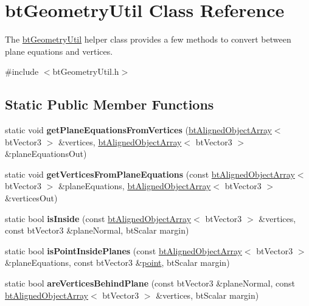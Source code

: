 \hypertarget{classbt_geometry_util}{\section{bt\+Geometry\+Util Class Reference}
\label{classbt_geometry_util}
}


The \hyperlink{classbt_geometry_util}{bt\+Geometry\+Util} helper class provides a few methods to convert between plane equations and vertices.  




{\ttfamily \#include $<$bt\+Geometry\+Util.\+h$>$}

\subsection*{Static Public Member Functions}
\begin{DoxyCompactItemize}
\item 
\hypertarget{classbt_geometry_util_abaaa4e4ffc288e196135d7ef789f83c3}{static void {\bfseries get\+Plane\+Equations\+From\+Vertices} (\hyperlink{classbt_aligned_object_array}{bt\+Aligned\+Object\+Array}$<$ bt\+Vector3 $>$ \&vertices, \hyperlink{classbt_aligned_object_array}{bt\+Aligned\+Object\+Array}$<$ bt\+Vector3 $>$ \&plane\+Equations\+Out)}\label{classbt_geometry_util_abaaa4e4ffc288e196135d7ef789f83c3}

\item 
\hypertarget{classbt_geometry_util_a449a76a3bf92bdf5fe5750c9f07578a1}{static void {\bfseries get\+Vertices\+From\+Plane\+Equations} (const \hyperlink{classbt_aligned_object_array}{bt\+Aligned\+Object\+Array}$<$ bt\+Vector3 $>$ \&plane\+Equations, \hyperlink{classbt_aligned_object_array}{bt\+Aligned\+Object\+Array}$<$ bt\+Vector3 $>$ \&vertices\+Out)}\label{classbt_geometry_util_a449a76a3bf92bdf5fe5750c9f07578a1}

\item 
\hypertarget{classbt_geometry_util_a2c6f6ac3418bb1790239f5483ccf1260}{static bool {\bfseries is\+Inside} (const \hyperlink{classbt_aligned_object_array}{bt\+Aligned\+Object\+Array}$<$ bt\+Vector3 $>$ \&vertices, const bt\+Vector3 \&plane\+Normal, bt\+Scalar margin)}\label{classbt_geometry_util_a2c6f6ac3418bb1790239f5483ccf1260}

\item 
\hypertarget{classbt_geometry_util_af9b4081395e9938e8be89807b9b3e527}{static bool {\bfseries is\+Point\+Inside\+Planes} (const \hyperlink{classbt_aligned_object_array}{bt\+Aligned\+Object\+Array}$<$ bt\+Vector3 $>$ \&plane\+Equations, const bt\+Vector3 \&\hyperlink{structpoint}{point}, bt\+Scalar margin)}\label{classbt_geometry_util_af9b4081395e9938e8be89807b9b3e527}

\item 
\hypertarget{classbt_geometry_util_a85d07406834e51d6e80a97b0ffccd6ca}{static bool {\bfseries are\+Vertices\+Behind\+Plane} (const bt\+Vector3 \&plane\+Normal, const \hyperlink{classbt_aligned_object_array}{bt\+Aligned\+Object\+Array}$<$ bt\+Vector3 $>$ \&vertices, bt\+Scalar margin)}\label{classbt_geometry_util_a85d07406834e51d6e80a97b0ffccd6ca}

\end{DoxyCompactItemize}


